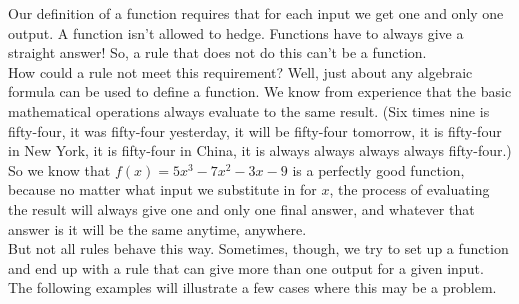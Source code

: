 Our definition of a function requires that for each input we get one and only one output. A function isn’t allowed to hedge. Functions have to always give a straight answer! So, a rule that does not do this can’t be a function.\\

How could a rule not meet this requirement? Well, just about any algebraic formula can be used to define a function. We know from experience that the basic mathematical operations always evaluate to the same result. (Six times nine is fifty-four, it was fifty-four yesterday, it will be fifty-four tomorrow, it is fifty-four in New York, it is fifty-four in China, it is always always always always fifty-four.) So we know that $f(x)=5x^3-7x^2-3x-9$ is a perfectly good function, because no matter what input we substitute in for $x$, the process of evaluating the result will always give one and only one final answer, and whatever that answer is it will be the same anytime, anywhere.\\

But not all rules behave this way. Sometimes, though, we try to set up a function and end up with a rule that can give more than one output for a given input. The following examples will illustrate a few cases where this may be a problem.




